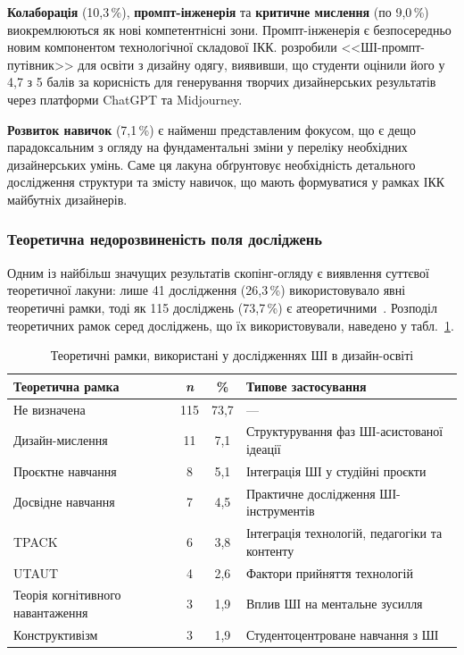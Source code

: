 \textbf{Колаборація} (10,3\,\%), \textbf{промпт-інженерія} та \textbf{критичне мислення} (по 9,0\,\%) виокремлюються як нові компетентнісні зони. Промпт-інженерія є безпосередньо новим компонентом технологічної складової ІКК. \citet{Lee2024} розробили <<ШІ-промпт-путівник>> для освіти з дизайну одягу, виявивши, що студенти оцінили його у 4,7 з 5 балів за корисність для генерування творчих дизайнерських результатів через платформи ChatGPT та Midjourney.

\textbf{Розвиток навичок} (7,1\,\%) є найменш представленим фокусом, що є дещо парадоксальним з огляду на фундаментальні зміни у переліку необхідних дизайнерських умінь. Саме ця лакуна обґрунтовує необхідність детального дослідження структури та змісту навичок, що мають формуватися у рамках ІКК майбутніх дизайнерів.

\subsubsection{Теоретична недорозвиненість поля досліджень}\label{sssec:1.2.7}

Одним із найбільш значущих результатів скопінг-огляду є виявлення суттєвої теоретичної лакуни: лише 41 дослідження (26,3\,\%) використовувало явні теоретичні рамки, тоді як 115 досліджень (73,7\,\%) є атеоретичними~\cite{Musiienko2026ScopingReview}. Розподіл теоретичних рамок серед досліджень, що їх використовували, наведено у табл.~\ref{tab:1.2_theory}.

\begin{table}[htbp]
\centering
\caption{Теоретичні рамки, використані у дослідженнях ШІ в дизайн-освіті}
\label{tab:1.2_theory}
\small
\begin{tabular}{@{}lccp{6cm}@{}}
\toprule
\textbf{Теоретична рамка} & \textbf{\textit{n}} & \textbf{\%} & \textbf{Типове застосування} \\
\midrule
Не визначена & 115 & 73,7 & --- \\
Дизайн-мислення & 11 & 7,1 & Структурування фаз ШІ-асистованої ідеації \\
Проєктне навчання & 8 & 5,1 & Інтеграція ШІ у студійні проєкти \\
Досвідне навчання & 7 & 4,5 & Практичне дослідження ШІ-інструментів \\
TPACK & 6 & 3,8 & Інтеграція технологій, педагогіки та контенту \\
UTAUT & 4 & 2,6 & Фактори прийняття технологій \\
Теорія когнітивного навантаження & 3 & 1,9 & Вплив ШІ на ментальне зусилля \\
Конструктивізм & 3 & 1,9 & Студентоцентроване навчання з ШІ \\
\bottomrule
\end{tabular}
\end{table}

